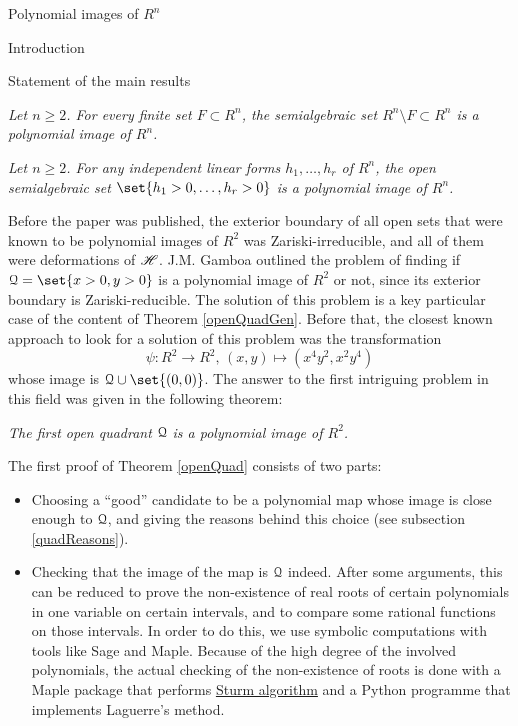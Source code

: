 \documentclass[11pt, a4paper, english, twoside, notitlepage, openright]{report}
\begin{document}
\begin{chapter}{Polynomial images of $R^n$}
\begin{section}{Introduction}
\begin{subsection}{Statement of the main results}
\begin{theorem}\label{finSetTh}\em Let $n\ge2$. For every finite set $F\subset R^n$, the semialgebraic set $R^n\setminus F\subset R^n$ is a polynomial image of $R^n$.\em
\end{theorem}
\begin{theorem}\label{openQuadGen}\em Let $n\ge 2$. For any independent linear forms $h_1,\dots,h_r$ of $R^n$, the open semialgebraic set $\set{h_1>0,\dots,h_r>0}$ is a polynomial image of $R^n$.\em
\end{theorem}
	
Before the paper \cite{fg} was published, the exterior boundary of all open sets that were known to be polynomial images of $R^2$ was Zariski-irreducible, and all of them were deformations of $\mathscr{H}$. J.M. Gamboa outlined the problem of finding if $\Qu=\set{x>0,y>0}$ is a polynomial image of $R^2$ or not, since its exterior boundary is Zariski-reducible. The solution of this problem is a key particular case of the content of Theorem \ref{openQuadGen}. Before that, the closest known approach to look for a solution of this problem was the transformation
$$
\psi:R^2 \to R^2,\, (x,y)\mapsto(x^4y^2,x^2y^4)
$$	
whose image is $\Qu\cup\set{(0,0)}$. The answer to the first intriguing problem in this field was given in the following theorem:
\begin{theorem}\label{openQuad}\em The first open quadrant $\mathcal{Q}$ is a polynomial image of $R^2$.\em
\end{theorem}
	
\begin{remark} The first proof of Theorem \ref{openQuad} consists of two parts:
\begin{itemize}
\item Choosing a ``good'' candidate to be a polynomial map whose image is close enough to $\mathcal{Q}$, and giving the reasons behind this choice (see subsection \ref{quadReasons}). 
	
\item Checking that the image of the map is $\mathcal{Q}$ indeed. After some arguments, this can be reduced to prove the non-existence of real roots of certain polynomials in one variable on certain intervals, and to compare some rational functions on those intervals. In order to do this, we use symbolic computations with tools like Sage and Maple. Because of the high degree of the involved polynomials, the actual checking of the non-existence of roots is done with a Maple package that performs \hyperref[sturm]{Sturm algorithm} and a Python programme that implements Laguerre's method. %
\end{itemize}
\end{remark}


\end{subsection}
\end{section}
\end{chapter}
\end{document}
